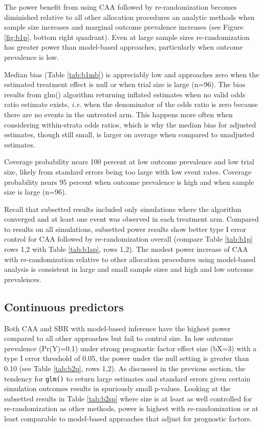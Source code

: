 The power benefit from using CAA followed by re-randomization becomes diminished relative to all other allocation procedures an analytic methods when sample size increases and marginal outcome prevalence increases (see Figure \ref{fig:b1p}, bottom right quadrant).
Even at large sample sizes re-randomization has greater power than model-based approaches, particularly when outcome prevalence is low.

Median bias (Table \ref{tab:b1mb}) is appreciably low and approaches zero when the estimated treatment effect is null or when trial size is large (n=96).
The bias results from glm() algorithm returning inflated estimates when no valid odds ratio estimate exists, \textit{i.e.} when the denominator of the odds ratio is zero because there are no events in the untreated arm.
This happens more often when considering within-strata odds ratios, which is why the median bias for adjusted estimates, though still small, is larger on average when compared to unadjusted estimates.

Coverage probability nears 100 percent at low outcome prevalence and low trial size, likely from standard errors being too large with low event rates.
Coverage probability nears 95 percent when outcome prevalence is high and when sample size is large (n=96).

Recall that subsetted results included only simulations where the algorithm converged and at least one event was observed in each treatment arm.
Compared to results on all simulations, subsetted power results show better type I error control for CAA followed by re-randomization overall (compare Table \ref{tab:b1p} rows 1,2 with Table \ref{tab:b1sp}, rows 1,2).
The modest power increase of CAA with re-randomization relative to other allocation procedures using model-based analysis is consistent in large and small sample sizes and high and low outcome prevalences.


\subsection{Continuous predictors}
Both CAA and SBR with model-based inference have the highest power compared to all other approaches but fail to control size.
In low outcome prevalence (Pr(Y)=0.1) under strong prognostic factor effect size (bX=3) with a type I error threshold of 0.05, the power under the null setting is greater than 0.10 (see Table \ref{tab:b2p}, rows 1,2). 
As discussed in the previous section, the tendency for \texttt{glm()} to return large estimates and standard errors given certain simulation outcomes results in spuriously small p-values. 
Looking at the subsetted results in Table \ref{tab:b2sp} where size is at least as well controlled for re-randomization as other methods, power is highest with re-randomization or at least comparable to model-based approaches that adjust for prognostic factors.

